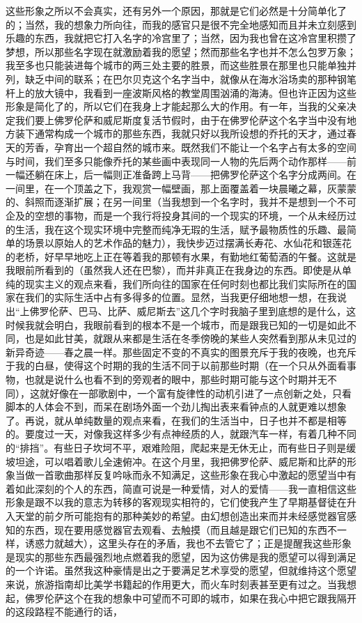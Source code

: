\par 这些形象之所以不会真实，还有另外一个原因，那就是它们必然是十分简单化了的；当然，我的想象力所向往，而我的感官只是很不完全地感知而且并未立刻感到乐趣的东西，我就把它打入名字的冷宫里了；当然，因为我也曾在这冷宫里积攒了梦想，所以那些名字现在就激励着我的愿望；然而那些名字也并不怎么包罗万象；我至多也只能装进每个城市的两三处主要的胜景，而这些胜景在那里也只能单独并列，缺乏中间的联系；在巴尔贝克这个名字当中，就像从在海水浴场卖的那种钢笔杆上的放大镜中，我看到一座波斯风格的教堂周围汹涌的海涛。但也许正因为这些形象是简化了的，所以它们在我身上才能起那么大的作用。有一年，当我的父亲决定我们要上佛罗伦萨和威尼斯度复活节假时，由于在佛罗伦萨这个名字当中没有地方装下通常构成一个城市的那些东西，我就只好以我所设想的乔托的天才，通过春天的芳香，孕育出一个超自然的城市来。既然我们不能让一个名字占有太多的空间与时间，我们至多只能像乔托的某些画中表现同一人物的先后两个动作那样——前一幅还躺在床上，后一幅则正准备跨上马背——把佛罗伦萨这个名字分成两间。在一间里，在一个顶盖之下，我观赏一幅壁画，那上面覆盖着一块晨曦之幕，灰蒙蒙的、斜照而逐渐扩展；在另一间里（当我想到一个名字时，我并不是想到一个不可企及的空想的事物，而是一个我行将投身其间的一个现实的环境，一个从未经历过的生活，我在这个现实环境中完整而纯净无瑕的生活，赋予最物质性的乐趣、最简单的场景以原始人的艺术作品的魅力），我快步迈过摆满长寿花、水仙花和银莲花的老桥，好早早地吃上正在等着我的那顿有水果，有勤地红葡萄酒的午餐。这就是我眼前所看到的（虽然我人还在巴黎），而并非真正在我身边的东西。即使是从单纯的现实主义的观点来看，我们所向往的国家在任何时刻也都比我们实际所在的国家在我们的实际生活中占有多得多的位置。显然，当我更仔细地想一想，在我说出“上佛罗伦萨、巴马、比萨、威尼斯去”这几个字时我脑子里到底想的是什么，这时候我就会明白，我眼前看到的根本不是一个城市，而是跟我已知的一切是如此不同，也是如此甘美，就跟从来都是生活在冬季傍晚的某些人突然看到那从未见过的新异奇迹——春之晨一样。那些固定不变的不真实的图景充斥于我的夜晚，也充斥于我的白昼，使得这个时期的我的生活不同于以前那些时期（在一个只从外面看事物，也就是说什么也看不到的旁观者的眼中，那些时期可能与这个时期并无不同），这就好像在一部歌剧中，一个富有旋律性的动机引进了一点创新之处，只看脚本的人体会不到，而呆在剧场外面一个劲儿掏出表来看钟点的人就更难以想象了。再说，就从单纯数量的观点来看，在我们的生活当中，日子也并不都是相等的。要度过一天，对像我这样多少有点神经质的人，就跟汽车一样，有着几种不同的“排挡”。有些日子坎坷不平，艰难险阻，爬起来是无休无止，而有些日子则是缓坡坦途，可以唱着歌儿全速俯冲。在这个月里，我把佛罗伦萨、威尼斯和比萨的形象当做一首歌曲那样反复吟咏而永不知满足，这些形象在我心中激起的愿望当中有着如此深刻的个人的东西，简直可说是一种爱情，对人的爱情——我一直相信这些形象是跟不以我的意志为转移的客观现实相符的，它们使我产生了早期基督徒在升入天堂的前夕所可能抱有的那种美妙的希望。由幻想创造出来而并未经感觉器官感知的东西，现在要用感觉器官去观看、去触摸（而且越是跟它们已知的东西不一样，诱惑力就越大），这里头存在的矛盾，我也不去管它了；正是提醒我这些形象是现实的那些东西最强烈地点燃着我的愿望，因为这仿佛是我的愿望可以得到满足的一个许诺。虽然我这种豪情是出之于要满足艺术享受的愿望，但就维持这个愿望来说，旅游指南却比美学书籍起的作用更大，而火车时刻表甚至更有过之。当我想起，佛罗伦萨这个在我的想象中可望而不可即的城市，如果在我心中把它跟我隔开的这段路程不能通行的话，